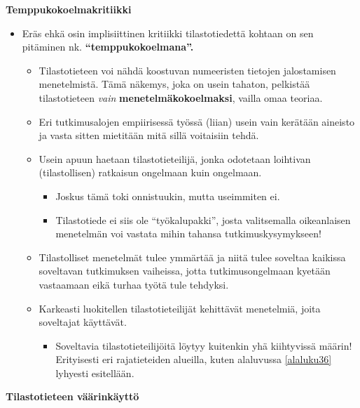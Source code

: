 \documentclass[
]{book}
\providecommand{\tightlist}{%
  \setlength{\itemsep}{0pt}\setlength{\parskip}{0pt}}
\begin{document}
\hfill\break
\hfill\break

\textbf{Temppukokoelmakritiikki}

\begin{itemize}
\tightlist
\item
  Eräs ehkä osin implisiittinen kritiikki tilastotiedettä kohtaan on sen pitäminen nk. \textbf{``temppukokoelmana''.}

  \begin{itemize}
  \tightlist
  \item
    Tilastotieteen voi nähdä koostuvan numeeristen tietojen jalostamisen menetelmistä. Tämä näkemys, joka on usein tahaton, pelkistää tilastotieteen \emph{vain} \textbf{menetelmäkokoelmaksi}, vailla omaa teoriaa.
  \item
    Eri tutkimusalojen empiirisessä työssä (liian) usein vain kerätään aineisto ja vasta sitten mietitään mitä sillä voitaisiin tehdä.
  \item
    Usein apuun haetaan tilastotieteilijä, jonka odotetaan loihtivan (tilastollisen) ratkaisun ongelmaan kuin ongelmaan.

    \begin{itemize}
    \tightlist
    \item
      Joskus tämä toki onnistuukin, mutta useimmiten ei.
    \item
      Tilastotiede ei siis ole ``työkalupakki'', josta valitsemalla oikeanlaisen menetelmän voi vastata mihin tahansa tutkimuskysymykseen!
    \end{itemize}
  \item
    Tilastolliset menetelmät tulee ymmärtää ja niitä tulee soveltaa kaikissa soveltavan tutkimuksen vaiheissa, jotta tutkimusongelmaan kyetään vastaamaan eikä turhaa työtä tule tehdyksi.
  \item
    Karkeasti luokitellen tilastotieteilijät kehittävät menetelmiä, joita soveltajat käyttävät.

    \begin{itemize}
    \tightlist
    \item
      Soveltavia tilastotieteilijöitä löytyy kuitenkin yhä kiihtyvissä määrin! Erityisesti eri rajatieteiden alueilla, kuten alaluvussa \ref{alaluku36} lyhyesti esitellään.
    \end{itemize}
  \end{itemize}
\end{itemize}

\textbf{Tilastotieteen väärinkäyttö}
\end{document}
